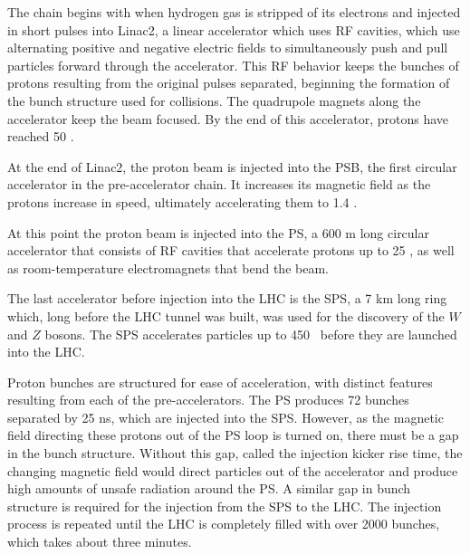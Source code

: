 The chain begins with when hydrogen gas is stripped of its electrons and injected in short pulses into Linac2, a linear accelerator which uses \ac{RF} cavities, which use alternating positive and negative electric fields to simultaneously push and pull particles forward through the accelerator. This \ac{RF} behavior keeps the bunches of protons resulting from the original pulses separated, beginning the formation of the bunch structure used for collisions. The quadrupole magnets along the accelerator keep the beam focused. By the end of this accelerator, protons have reached 50 \mev. 

At the end of Linac2, the proton beam is injected into the \ac{PSB}, the first circular accelerator in the pre-accelerator chain. It increases its magnetic field as the protons increase in speed, ultimately accelerating them to 1.4 \gev. 

At this point the proton beam is injected into the \ac{PS}, a 600 m long circular accelerator that consists of \ac{RF} cavities that accelerate protons up to 25 \gev, as well as room-temperature electromagnets that bend the beam. 

The last accelerator before injection into the \ac{LHC} is the \ac{SPS}, a 7 km long ring which, long before the \ac{LHC} tunnel was built, was used for the discovery of the $W$ and $Z$ bosons. The \ac{SPS} accelerates particles up to 450 \gev~before they are launched into the \ac{LHC}. 

Proton bunches are structured for ease of acceleration, with distinct features resulting from each of the pre-accelerators. The \ac{PS} produces 72 bunches separated by 25 ns, which are injected into the \ac{SPS}. %
However, as the magnetic field directing these protons out of the \ac{PS} loop is turned on, there must be a gap in the bunch structure. Without this gap, called the injection kicker rise time, the changing magnetic field would direct particles out of the accelerator and produce high amounts of unsafe radiation around the \ac{PS}. A similar gap in bunch structure is required for the injection from the \ac{SPS} to the \ac{LHC}. The injection process is repeated until the \ac{LHC} is completely filled with over 2000 bunches, which takes about three minutes.


